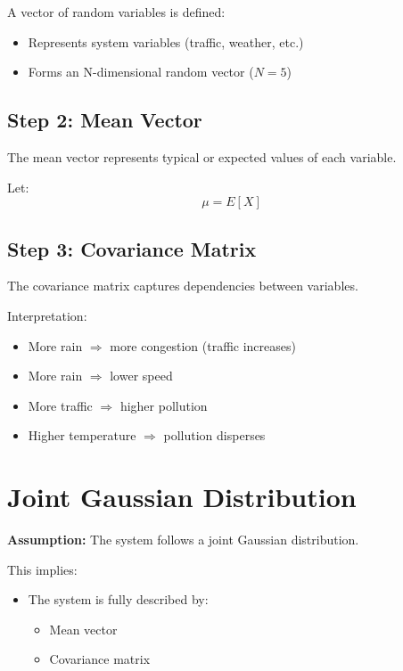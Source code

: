 \documentclass[11pt]{article}
\begin{document}
A vector of random variables is defined:
\begin{itemize}
    \item Represents system variables (traffic, weather, etc.)
    \item Forms an N-dimensional random vector ($N = 5$)
\end{itemize}

\subsection*{Step 2: Mean Vector}

The mean vector represents typical or expected values of each variable.

Let:
\[
\mu = E[X]
\]

\subsection*{Step 3: Covariance Matrix}

The covariance matrix captures dependencies between variables.

Interpretation:
\begin{itemize}
    \item More rain $\Rightarrow$ more congestion (traffic increases)
    \item More rain $\Rightarrow$ lower speed
    \item More traffic $\Rightarrow$ higher pollution
    \item Higher temperature $\Rightarrow$ pollution disperses
\end{itemize}

\section{Joint Gaussian Distribution}

\textbf{Assumption:} The system follows a joint Gaussian distribution.

This implies:
\begin{itemize}
    \item The system is fully described by:
    \begin{itemize}
        \item Mean vector
        \item Covariance matrix
    \end{itemize}
\end{itemize}
\end{document}
